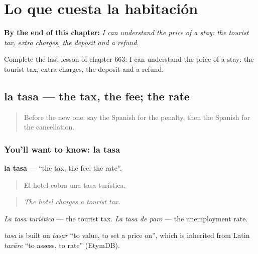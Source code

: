 
\chapter{Lo que cuesta la habitación}
\label{ch:es-lo-que-cuesta-la-habitacion}

\begin{chapteropening}
\textbf{By the end of this chapter:} \emph{I can understand the price of a stay: the tourist tax, extra charges, the deposit and a refund.}

Complete the last lesson of chapter 663: I can understand the price of a stay: the tourist tax, extra charges, the deposit and a refund.
\end{chapteropening}

\section[la tasa]{la tasa — the tax, the fee; the rate}

\label{lesson:ES-C663-tasa}



\begin{quote}
Before the new one: say the Spanish for the penalty, then the Spanish for the cancellation.
\end{quote}

\subsection*{You'll want to know: la tasa}
\textbf{la tasa} — \textquotedblleft{}the tax, the fee; the rate\textquotedblright{}.

\begin{quote}
El hotel cobra una tasa turística.
\end{quote}

\begin{quote}
\emph{The hotel charges a tourist tax.}
\end{quote}

\emph{La tasa turística} — the tourist tax. \emph{La tasa de paro} — the unemployment rate.

\begin{cousinweb}
\emph{tasa} is built on \emph{tasar} \textquotedblleft{}to value, to set a price on\textquotedblright{}, which is inherited from Latin \emph{taxāre} \textquotedblleft{}to assess, to rate\textquotedblright{} (EtymDB).
\end{cousinweb}

